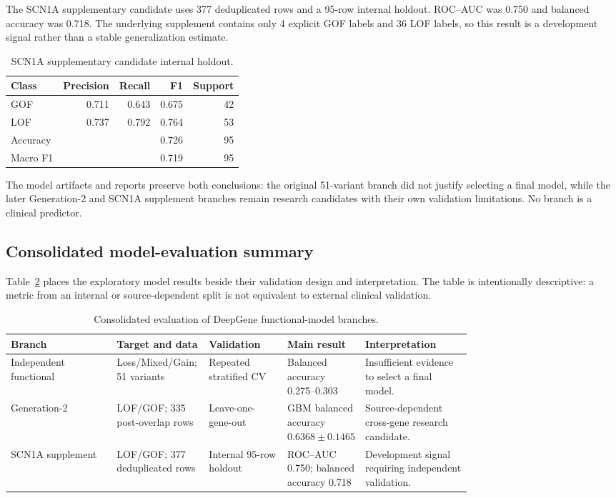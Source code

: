 \documentclass[12pt,a4paper]{article}
\begin{document}
The SCN1A supplementary candidate uses 377 deduplicated rows and a 95-row internal holdout. ROC--AUC was 0.750 and balanced accuracy was 0.718. The underlying supplement contains only 4 explicit GOF labels and 36 LOF labels, so this result is a development signal rather than a stable generalization estimate.

\begin{table}[H]
\centering
\small
\caption{SCN1A supplementary candidate internal holdout.}
\label{tab:supplement}
\begin{tabular}{lrrrr}
\toprule
Class & Precision & Recall & F1 & Support\\
\midrule
GOF & 0.711 & 0.643 & 0.675 & 42\\
LOF & 0.737 & 0.792 & 0.764 & 53\\
\midrule
Accuracy & \multicolumn{3}{r}{0.726} & 95\\
Macro F1 & \multicolumn{3}{r}{0.719} & 95\\
\bottomrule
\end{tabular}
\end{table}

The model artifacts and reports preserve both conclusions: the original 51-variant branch did not justify selecting a final model, while the later Generation-2 and SCN1A supplement branches remain research candidates with their own validation limitations. No branch is a clinical predictor.

\subsection{Consolidated model-evaluation summary}
Table~\ref{tab:modelevaluation} places the exploratory model results beside their validation design and interpretation. The table is intentionally descriptive: a metric from an internal or source-dependent split is not equivalent to external clinical validation.

\begin{table}[H]
\centering
\small
\caption{Consolidated evaluation of DeepGene functional-model branches.}
\label{tab:modelevaluation}
\begin{tabularx}{\linewidth}{p{0.23\linewidth}p{0.20\linewidth}p{0.17\linewidth}p{0.15\linewidth}X}
\toprule
Branch & Target and data & Validation & Main result & Interpretation\\
\midrule
Independent functional & Loss/Mixed/Gain; 51 variants & Repeated stratified CV & Balanced accuracy 0.275--0.303 & Insufficient evidence to select a final model.\\
Generation-2 & LOF/GOF; 335 post-overlap rows & Leave-one-gene-out & GBM balanced accuracy $0.6368\pm0.1465$ & Source-dependent cross-gene research candidate.\\
SCN1A supplement & LOF/GOF; 377 deduplicated rows & Internal 95-row holdout & ROC--AUC 0.750; balanced accuracy 0.718 & Development signal requiring independent validation.\\
\bottomrule
\end{tabularx}
\end{table}
\end{document}
